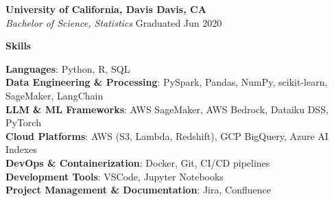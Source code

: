 \documentclass[letterpaper,11pt]{article}
\newcommand{\resumesection}[1]{
  \vspace{8pt}
  \noindent\textbf{\Large #1} \\
  \vspace{2pt}
}
\begin{document}
\textbf{University of California, Davis \hfill Davis, CA} \\
\textit{Bachelor of Science, Statistics} \hfill Graduated Jun 2020

\resumesection{Skills}

\begin{itemize}[leftmargin=0.15in, label={}, itemsep=1pt, parsep=0pt]
    \small{\item{
    \textbf{Languages}{: Python, R, SQL} \\
    \textbf{Data Engineering \& Processing}{: PySpark, Pandas, NumPy, scikit-learn, SageMaker, LangChain} \\
    \textbf{LLM \& ML Frameworks}{: AWS SageMaker, AWS Bedrock, Dataiku DSS, PyTorch} \\
    \textbf{Cloud Platforms}{: AWS (S3, Lambda, Redshift), GCP BigQuery, Azure AI Indexes} \\
    \textbf{DevOps \& Containerization}{: Docker, Git, CI/CD pipelines} \\
    \textbf{Development Tools}{: VSCode, Jupyter Notebooks} \\
    \textbf{Project Management \& Documentation}{: Jira, Confluence}
    }}
\end{itemize}
\end{document}
